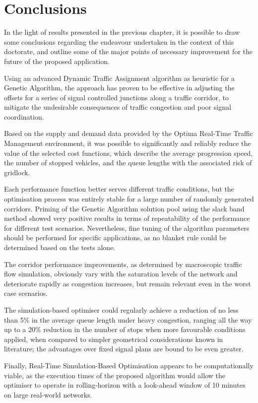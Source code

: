 \chapter{Conclusions} \label{c:conclusions}

In the light of results presented in the previous chapter, it is possible to draw some conclusions regarding the endeavour undertaken in the context of this doctorate, and outline some of the major points of necessary improvement for the future of the proposed application.

Using an advanced Dynamic Traffic Assignment algorithm as heuristic for a Genetic Algorithm, the approach has proven to be effective in adjusting the offsets for a series of signal controlled junctions along a traffic corridor, to mitigate the undesirable consequences of traffic congestion and poor signal coordination.

Based on the supply and demand data provided by the Optima Real-Time Traffic Management environment, it was possible to significantly and reliably reduce the value of the selected cost functions, which describe the average progression speed, the number of stopped vehicles, and the queue lengths with the associated risk of gridlock.

Each performance function better serves different traffic conditions, but the optimisation process was entirely stable for a large number of randomly generated corridors. Priming of the Genetic Algorithm solution pool using the slack band method showed very positive results in terms of repeatability of the performance for different test scenarios. Nevertheless, fine tuning of the algorithm parameters should be performed for specific applications, as no blanket rule could be determined based on the tests alone.

The corridor performance improvements, as determined by macroscopic traffic flow simulation, obviously vary with the saturation levels of the network and deteriorate rapidly as congestion increases, but remain relevant even in the worst case scenarios.

The simulation-based optimiser could regularly achieve a reduction of no less than 5\% in the average queue length under heavy congestion, ranging all the way up to a 20\% reduction in the number of stops when more favourable conditions applied, when compared to simpler geometrical considerations known in literature; the advantages over fixed signal plans are bound to be even greater.

Finally, Real-Time Simulation-Based Optimisation appears to be computationally viable, as the execution times of the proposed algorithm would allow the optimiser to operate in rolling-horizon with a look-ahead window of 10 minutes on large real-world networks.


